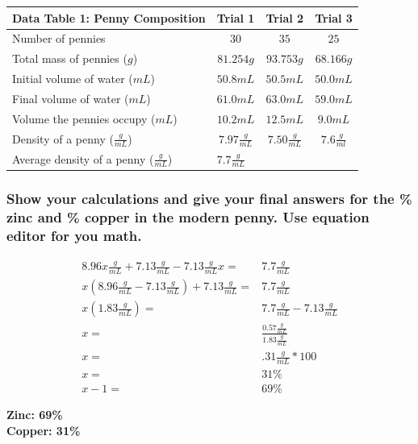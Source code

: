 \documentclass[a4paper,10pt]{article}
\begin{document}
  \begin{table}[h!]
    \renewcommand{\arraystretch}{1.5}
    \label{tab:table1}
    \begin{tabular}{|l|c|c|c|}
      \hline
      \textbf{Data Table 1: Penny Composition} & \textbf{Trial 1} & \textbf{Trial 2} & \textbf{Trial 3}\\
      \hline
      Number of pennies & $30$ & $35$ & $25$ \\
      \hline
      Total mass of pennies ($g$) & $81.254g$ & $93.753g$ & $68.166g$ \\
      \hline
      Initial volume of water ($mL$) & $50.8mL$ & $50.5mL$ & $50.0mL$ \\
      \hline
      Final volume of water ($mL$) & $61.0mL$ & $63.0mL$ & $59.0mL$ \\
      \hline
      Volume the pennies occupy ($mL$) & $10.2mL$ & $12.5mL$ & $9.0mL$ \\
      \hline
      Density of a penny ($\frac{g}{mL}$) & $7.97\frac{g}{mL}$ & $7.50\frac{g}{mL}$ & $7.6\frac{g}{ml}$\\
      \hline
      Average density of a penny ($\frac{g}{mL}$) & \multicolumn{2}{l}{$7.7\frac{g}{mL}$} & \\
      \hline
    \end{tabular}
  \end{table}

  \subsubsection*{Show your calculations and give your final answers for the \% zinc and \% copper in the modern penny. Use equation editor for you math.}

  \begin{align}
    8.96x\frac{g}{mL} + 7.13\frac{g}{mL} - 7.13\frac{g}{mL}x = & 7.7\frac{g}{mL} \\
    x(8.96\frac{g}{mL} - 7.13\frac{g}{mL}) + 7.13\frac{g}{mL} = & 7.7\frac{g}{mL} \\
    x(1.83\frac{g}{mL}) = & 7.7\frac{g}{mL} - 7.13\frac{g}{mL} \\
    x = & \frac{0.57\frac{g}{mL}}{1.83\frac{g}{mL}} \\
    x = & .31\frac{g}{mL} * 100 \\
    x = & 31\% \\
    x - 1 = & 69\%
  \end{align}

  \begin{flushleft}
  \textbf{Zinc: 69\%} \\
  \textbf{Copper: 31\%}
\end{flushleft}
 
\end{document}
